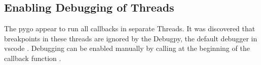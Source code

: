 \subsection{Enabling Debugging of Threads}
The \gls{pygo} appear to run all callbacks in separate Threads.
It was discovered that breakpoints in these threads are ignored by the Debugpy, the default debugger in \gls{vscode} \cite{microsoftDebugpyDebuggerPython2023}\cite{visualstudiocodeDebuggingConfigurationsPython2023}.
Debugging can be enabled manually by calling  at the beginning of the callback function \cite{nadigAnswerDebugNot2019}.


